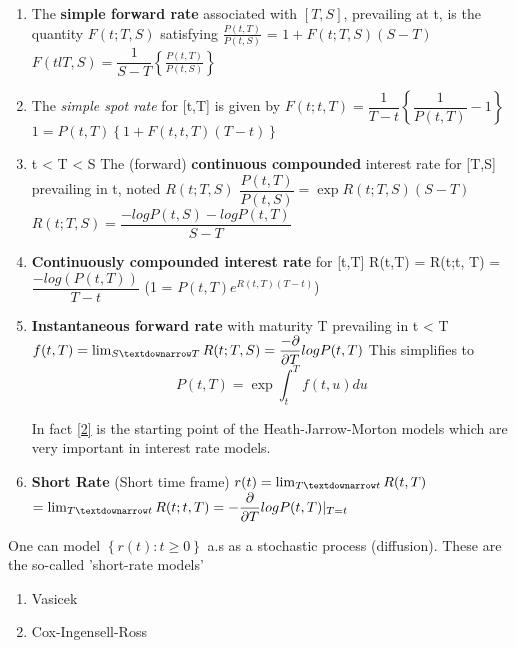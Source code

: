 \begin{enumerate}
 \item The \textbf{simple forward rate} associated with $[T,S]$, prevailing at t, is the quantity $F(t; T, S)$ 
satisfying 
$\frac{P(t,T)}{P(t,S)}$ = $1 + F(t; T, S)(S - T)$
\newline $F(tl T, S) = \dfrac{1}{S-T} \left\lbrace \frac{P(t,T)}{P(t,S)}\right\rbrace$
\item The \textit{simple spot rate} for [t,T] is given by 
$F(t; t, T) = \dfrac{1}{T-t} \left\lbrace \dfrac{1}{P(t,T)} - 1 \right\rbrace$
\newline $1 = P(t,T) \left\lbrace 1 + F(t,t, T) (T-t) \right\rbrace$
\item t < T < S
\newline The (forward) \textbf{continuous compounded} interest rate for [T,S] prevailing in t, noted $R(t; T, S)$
\newline $\dfrac{P(t,T)}{P(t,S)} = \exp {R(t;T,S)(S-T)}$
\newline $R(t; T, S) = \dfrac{-log P(t,S) - log P(t,T)}{S - T}$
\item \textbf{Continuously compounded interest rate} for [t,T]
\newline R(t,T) = R(t;t, T) = $\dfrac{-log(P(t,T))}{T-t}$
\newline (1 = $P(t,T) e^{R(t,T)(T-t)}$)
\item \textbf{Instantaneous forward rate} with maturity T prevailing in t < T
\newline $f(t,T) = \lim_{S \textdownarrow T}R(t; T, S) = \dfrac{-\partial}{\partial T} log P(t,T)$
This simplifies to 
\begin{equation}\label{2}
 P(t,T) = \exp {\int_t^T f(t,u) du}
\end{equation}
\begin{rem} In fact \ref{2} is the starting point of the Heath-Jarrow-Morton models which are very important in 
 interest rate models. 
\end{rem}
\item \textbf{Short Rate} (Short time frame)
\newline $r(t) = \lim_{T \textdownarrow t}R(t,T)$
\newline \quad $=\lim_{T \textdownarrow t} R(t; t, T) = - \dfrac{\partial}{\partial T} log P(t,T)|_{T=t}$
\end{enumerate}
\begin{rem} One can model $\left\lbrace r(t): t \geq 0\right\rbrace$ a.s as a stochastic process (diffusion). These 
are the so-called 'short-rate models' 
\begin{enumerate} 
 \item Vasicek 
\item Cox-Ingensell-Ross
\end{enumerate}
\end{rem}
